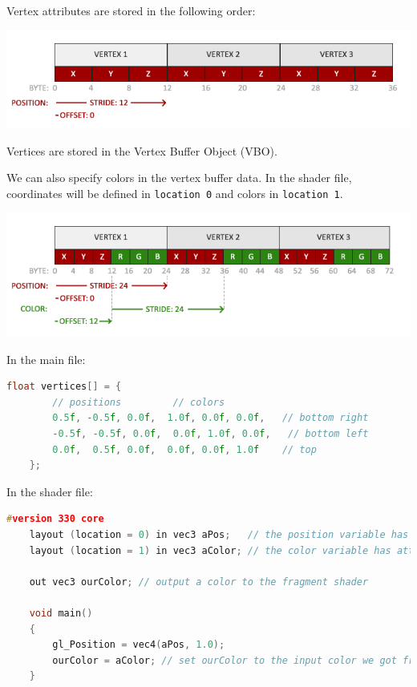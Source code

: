 Vertex attributes are stored in the following order:

\begin{center}
    \includegraphics[scale = 0.5]{pics/vertex_attribute_pointer.png}
\end{center}

Vertices are stored in the Vertex Buffer Object (VBO).

We can also specify colors in the vertex buffer data. In the shader file, coordinates will be defined in \verb|location 0| and colors in \verb|location 1|.

\begin{center}
    \includegraphics[scale = 0.5]{pics/vertex_attribute_pointer_interleaved.png}
\end{center}
\newpage
In the main file:

\begin{lstlisting}[language=C++]
    float vertices[] = {
        // positions         // colors
        0.5f, -0.5f, 0.0f,  1.0f, 0.0f, 0.0f,   // bottom right
        -0.5f, -0.5f, 0.0f,  0.0f, 1.0f, 0.0f,   // bottom left
        0.0f,  0.5f, 0.0f,  0.0f, 0.0f, 1.0f    // top 
    };   
\end{lstlisting}

In the shader file:

\begin{lstlisting}[language=C++]
    #version 330 core
    layout (location = 0) in vec3 aPos;   // the position variable has attribute position 0
    layout (location = 1) in vec3 aColor; // the color variable has attribute position 1
    
    out vec3 ourColor; // output a color to the fragment shader

    void main()
    {
        gl_Position = vec4(aPos, 1.0);
        ourColor = aColor; // set ourColor to the input color we got from the vertex data
    }       
\end{lstlisting}

